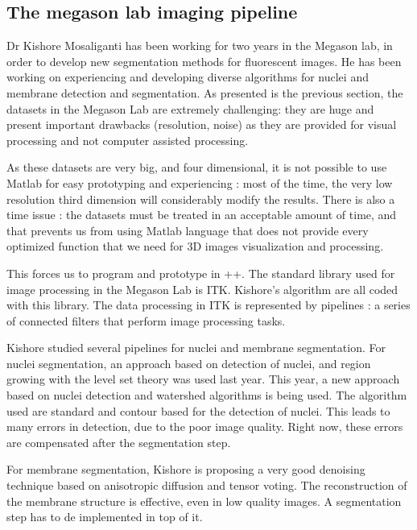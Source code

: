 








\subsection{The megason lab imaging pipeline}

Dr Kishore Mosaliganti has been working for two years in the Megason lab, in order to develop new segmentation methods for fluorescent images.
He has been working on experiencing and developing diverse algorithms for nuclei and membrane detection and segmentation.
As presented is the previous section, the datasets in the Megason Lab are extremely challenging:
they are huge and present important drawbacks (resolution, noise) as they are provided for visual processing and not computer assisted processing.

As these datasets are very big, and four dimensional, it is not possible to use Matlab for easy prototyping and experiencing : 
most of the time, the very low resolution third dimension will considerably modify the results.
There is also a time issue : the datasets must be treated in an acceptable amount of time,
and that prevents us from using Matlab language that does not provide every optimized function that we need for 3D images visualization and processing.

This forces us to program and prototype in {\C++}. The standard library used for image processing in the Megason Lab is ITK. Kishore's algorithm are all coded with this library.
The data processing in ITK is represented by pipelines : a series of connected filters that perform image processing tasks.


Kishore studied several pipelines for nuclei and membrane segmentation.
For nuclei segmentation, an approach based on detection of nuclei, and region growing with the level set theory was used last year.
This year, a new approach based on nuclei detection and watershed algorithms is being used.
The algorithm used are standard and contour based for the detection of nuclei.
This leads to many errors in detection, due to the poor image quality. Right now, these errors are compensated after the segmentation step.

For membrane segmentation, Kishore is proposing a very good denoising technique based on anisotropic diffusion and tensor voting.
The reconstruction of the membrane structure is effective, even in low quality images. A segmentation step has to de implemented in top of it.

